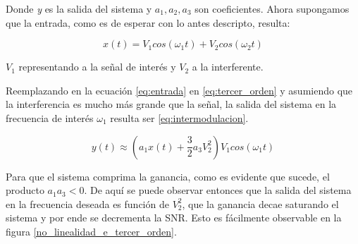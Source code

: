 \documentclass[12pt]{report}
\begin{document}
Donde \emph{y} es la salida del sistema y \(a_1, a_2, a_3 \) son coeficientes. Ahora supongamos que la entrada, como es de esperar con lo antes
descripto, resulta:

\begin{equation}\label{eq:entrada}
    x(t)=V_1 cos(\omega_1 t)+ V_2 cos(\omega_2 t)
\end{equation}

\(V_1\) representando a la señal de interés y \(V_2\) a la interferente.\par
Reemplazando en la ecuación \ref{eq:entrada} en \ref{eq:tercer_orden} y asumiendo que la interferencia es mucho más grande que la señal, 
la salida del sistema en la frecuencia de interés \(\omega_1\) resulta ser \ref{eq:intermodulacion}.

\begin{equation}\label{eq:intermodulacion}
    y(t) \approx \left( a_1 x(t) + \frac{3}{2} a_3 V_2^{2} \right) V_1  cos(\omega_1 t)
\end{equation}

Para que el sistema comprima la ganancia, como es evidente que sucede, el producto \(a_1 a_3 < 0\). De aquí se puede observar entonces que
la salida del sistema en la frecuencia deseada es función de \(V_2^{2}\), que la ganancia decae saturando el sistema y por ende se decrementa 
la SNR. Esto es fácilmente observable en la figura \ref{no_linealidad_e_tercer_orden}.
\end{document}
